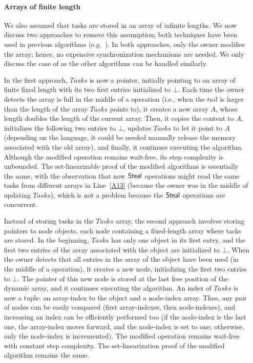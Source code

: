 \paragraph*{Arrays of finite length}
We also assumed that tasks are stored in an array of infinite lengths. We now discuss two approaches to remove this assumption; both techniques have been used in previous algorithms (e.g.~\cite{DBLP_conf_wdag_AdasF20, DBLP_conf_opodis_AfekKY10, maged.vechev.2009, non.blocking.work.stealing, DBLP_conf_ppopp_YangM16}).  In both approaches, only the owner modifies the array; hence, no expensive synchronization mechanisms are needed.  We only discuss the case of \WFWSM{} as the other algorithms can be handled similarly.

In the first approach, \(Tasks\) is now a pointer, initially pointing to an array of finite fixed length with its two first entries initialized to \(\bot\). Each time the owner detects the array is full in the middle of a \Put{} operation (i.e., when the \(tail\) is larger than the length of the array \(Tasks\) points to), it creates a new array \(A\), whose length doubles the length of the current array.  Then, it copies the content to \(A\), initializes the following two entries to \(\bot\), updates \(Tasks\) to let it point to \(A\) (depending on the language, it could be needed manually release the memory associated with the old array), and finally, it continues executing the algorithm. Although the modified \Put{} operation remains wait-free, its step complexity is unbounded.  The set-linearizable proof of the modified algorithms is essentially the same, with the observation that now ${\sf Steal}$ operations might read the same tasks from different arrays in Line~\ref{A13} (because the owner was in the middle of updating $Tasks$), which is not a problem because the ${\sf Steal}$ operations are concurrent.

Instead of storing tasks in the \(Tasks\) array, the second approach involves storing pointers to node objects, each node containing a fixed-length array where tasks are stored. In the beginning, \(Tasks\) has only one object in its first entry, and the first two entries of the array associated with the object are initialized to \(\bot\).  When the owner detects that all entries in the array of the object have been used (in the middle of a \Put{} operation), it creates a new node, initializing the first two entries to \(\bot\). The pointer of this new node is stored at the last free position of the dynamic array, and it continues executing the algorithm. An index of \(Tasks\) is now a tuple: an array-index to the object and a node-index array. Thus, any pair of nodes can be easily compared (first array-indexes, then node-indexes), and increasing an index can be efficiently performed too (if the node-index is the last one, the array-index moves forward, and the node-index is set to one; otherwise, only the node-index is incremented).  The modified \Put{} operation remains wait-free with constant step complexity. The set-linearization proof of the modified algorithm remains the same.


